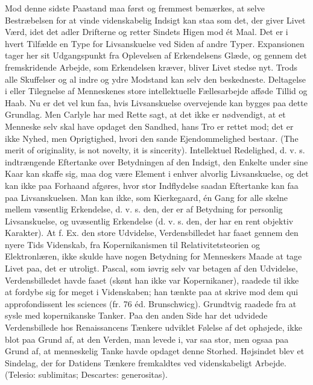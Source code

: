 \documentclass[12pt]{article}
\newcommand{\apage}[1]{\marginnote{\footnotesize\textit{[#1]}}}
\begin{document}
Mod denne sidste Paastand maa først og fremmest bemærkes, at selve Bestræbelsen
for at vinde videnskabelig Indsigt kan staa som det, der giver Livet Værd, idet
det adler Drifterne og retter Sindets Higen mod ét Maal. Det er i hvert
Tilfælde en Type for Livsanskuelse ved Siden af andre Typer. Expansionen tager
her sit Udgangspunkt fra Oplevelsen af Erkendelsens Glæde, og gennem det
fremskridende Arbejde, som Erkendelsen kræver, bliver Livet stedse nyt. Trods
alle Skuffelser og al indre og ydre Modstand kan selv den beskedneste.
Deltagelse i eller Tilegnelse af Menneskenes store intellektuelle Fællesarbejde
afføde Tillid og Haab. Nu er det vel kun faa, hvis Livsanskuelse overvejende
kan bygges paa dette Grundlag. Men Carlyle har med Rette sagt, at det ikke er
nødvendigt, at et Menneske selv skal have opdaget den Sandhed, hans Tro er
rettet mod; det er ikke Nyhed, men Oprigtighed, hvori den sande Ejendommelighed
bestaar. (The merit of originality, is not novelty, it is sincerity).
Intellektuel Redelighed, d. v. s. indtrængende Eftertanke over Betydningen af
den Indsigt, den Enkelte under sine Kaar kan skaffe sig, maa dog være Element i
enhver alvorlig Livsanskuelse, og det
\setcounter{footnote}{0}%
\apage{73}kan ikke paa Forhaand afgøres, hvor stor Indflydelse saadan
Eftertanke kan faa paa Livsanskuelsen. Man kan ikke, som Kierkegaard, én Gang
for alle skelne mellem \guillemotright{}væsentlig\guillemotleft{} Erkendelse,
d. v. s. den, der er af Betydning for personlig Livsanskuelse, og
\guillemotright{}uvæsentlig\guillemotleft{} Erkendelse (d. v. s. den, der har
en rent objektiv Karakter). At f. Ex. den store Udvidelse, Verdensbilledet har
faaet gennem den nyere Tids Videnskab, fra Kopernikanismen til
Relativitetsteorien og Elektronlæren, ikke skulde have nogen Betydning for
Menneskers Maade at tage Livet paa, det er utroligt. Pascal, som iøvrig selv
var betagen af den Udvidelse, Verdensbilledet havde faaet (skønt han ikke var
Kopernikaner), raadede til ikke at fordybe sig for meget i Videnskaben; han
tænkte paa at skrive mod dem \guillemotright{}qui approfondissent les
sciences\guillemotleft{} (fr. 76 éd. Brunschwicg). Grundtvig raadede fra at
sysle med kopernikanske Tanker. Paa den anden Side har det udvidede
Verdensbillede hos Renaissancens Tænkere udviklet Følelse af det ophøjede, ikke
blot paa Grund af, at den Verden, man levede i, var saa stor, men ogsaa paa
Grund af, at menneskelig Tanke havde opdaget denne Storhed. Højsindet blev et
Sindelag, der for Datidens Tænkere fremkaldtes ved videnskabeligt Arbejde.
(Telesio: sublimitas; Descartes: generositas).
\end{document}

